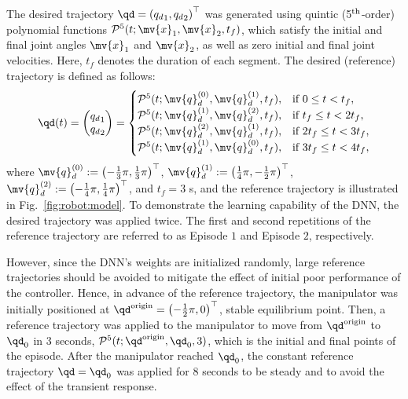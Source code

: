 \documentclass[lettersize,journal]{IEEEtran}
\begin{document}
The desired trajectory $\qd=\left({q_d}_1,{q_d}_2\right)^\top $ was generated using quintic (5$\textsuperscript{th}$-order) polynomial functions $\mathcal{P}^5(t;\mv{x}_1,\mv{x}_2,t_f)$, which satisfy the initial and final joint angles $\mv{x}_1$ and $\mv{x}_2$, as well as zero initial and final joint velocities. 
Here, $t_f$ denotes the duration of each segment.
The desired (reference) trajectory is defined as follows:
\begin{equation}
    \qd(t) 
    =
    \begin{pmatrix}
        {q_d}_1
        \\
        {q_d}_2
    \end{pmatrix}
    =
    \begin{cases}
    \mathcal{P}^5(t;\mv{q}_d^{(0)},\mv{q}_d^{(1)},t_f),
        &
        \text{if } 0 \le t < t_f 
        ,
        \\
    \mathcal{P}^5(t;\mv{q}_d^{(1)},\mv{q}_d^{(2)},t_f),
        &
        \text{if } t_f \le t < 2t_f 
        ,
        \\
    \mathcal{P}^5(t;\mv{q}_d^{(2)},\mv{q}_d^{(1)},t_f),
        & 
        \text{if } 2t_f \le t < 3t_f 
        ,
        \\
    \mathcal{P}^5(t;\mv{q}_d^{(1)},\mv{q}_d^{(0)},t_f),
        &    
        \text{if } 3t_f \le t < 4t_f 
        ,
        \\
    \end{cases}
    \label{eq:desired trajectory}
\end{equation}
where 
$
    \mv{q}_d^{(0)}:=\left(-\tfrac{1}{3}\pi,\tfrac{1}{3}\pi\right)^\top
$, 
$
    \mv{q}_d^{(1)}:=\left(\tfrac{1}{4}\pi,-\tfrac{1}{2}\pi\right)^\top
$, 
$
    \mv{q}_d^{(2)}:=\left(-\tfrac{1}{4}\pi,\tfrac{1}{4}\pi\right)^\top
$, 
and $t_f=3$ s, and the reference trajectory is illustrated in Fig.~\ref{fig:robot:model}.
To demonstrate the learning capability of the DNN, the desired trajectory was applied twice. 
The first and second repetitions of the reference trajectory are referred to as Episode $1$ and Episode $2$, respectively.


However, since the DNN's weights are initialized randomly, large reference trajectories should be avoided to mitigate the effect of initial poor performance of the controller.
Hence, in advance of the reference trajectory, the manipulator was initially positioned at ${\qd}^{\rm{origin}}=\left(-\tfrac{1}{2}\pi,0\right)^\top$, \ie stable equilibrium point.
Then, a reference trajectory was applied to the manipulator to move from ${\qd}^{\rm{origin}}$ to ${\qd}_0$ in 3 seconds, \ie $\mathcal{P}^5(t;{\qd}^{\rm{origin}},{\qd}_0,3)$, which is the initial and final points of the episode.
After the manipulator reached ${\qd}_0$, the constant reference trajectory $\qd={\qd}_0$ was applied for 8 seconds to be steady and to avoid the effect of the transient response.
\end{document}
